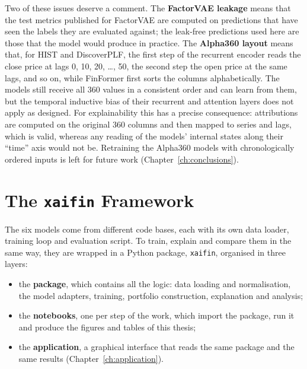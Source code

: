 Two of these issues deserve a comment. The \textbf{FactorVAE leakage} means that the test metrics published for FactorVAE are computed on predictions that have seen the labels they are evaluated against; the leak-free predictions used here are those that the model would produce in practice. The \textbf{Alpha360 layout} means that, for HIST and DiscoverPLF, the first step of the recurrent encoder reads the close price at lags 0, 10, 20, \ldots, 50, the second step the open price at the same lags, and so on, while FinFormer first sorts the columns alphabetically. The models still receive all 360 values in a consistent order and can learn from them, but the temporal inductive bias of their recurrent and attention layers does not apply as designed. For explainability this has a precise consequence: attributions are computed on the original 360 columns and then mapped to series and lags, which is valid, whereas any reading of the models' internal states along their ``time'' axis would not be. Retraining the Alpha360 models with chronologically ordered inputs is left for future work (Chapter~\ref{ch:conclusions}).

\section{The \texttt{xaifin} Framework}
\label{sec:fw_xaifin}

The six models come from different code bases, each with its own data loader, training loop and evaluation script. To train, explain and compare them in the same way, they are wrapped in a Python package, \texttt{xaifin}, organised in three layers:
\begin{itemize}[noitemsep]
    \item the \textbf{package}, which contains all the logic: data loading and normalisation, the model adapters, training, portfolio construction, explanation and analysis;
    \item the \textbf{notebooks}, one per step of the work, which import the package, run it and produce the figures and tables of this thesis;
    \item the \textbf{application}, a graphical interface that reads the same package and the same results (Chapter~\ref{ch:application}).
\end{itemize}

